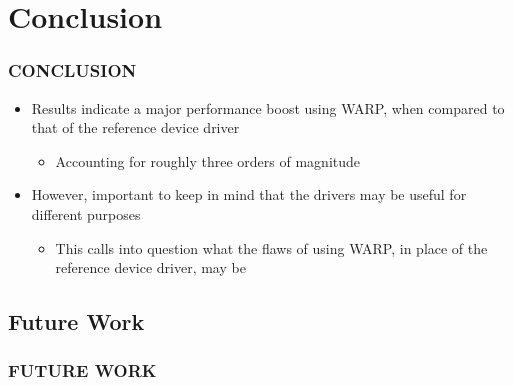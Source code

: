 
\section{Conclusion}
\begin{frame}
\frametitle{CONCLUSION}

\begin{itemize}
\item Results indicate a major performance boost using WARP, when compared to that of the reference device driver
  \begin{itemize}
  \item Accounting for roughly three orders of magnitude
  \end{itemize}
\item However, important to keep in mind that the drivers may be useful for different purposes
  \begin{itemize}
  \item This calls into question what the flaws of using WARP, in place of the reference device driver, may be
  \end{itemize}
\end{itemize}

\end{frame}

\subsection{Future Work}
\begin{frame}
\frametitle{FUTURE WORK}


\end{frame}
